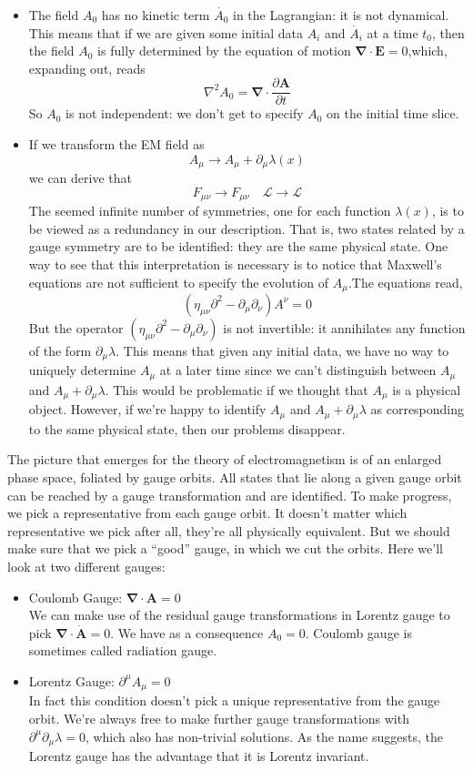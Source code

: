 \begin{itemize}
\item The field $A_0$ has no kinetic term $\dot{A_0}$ in the Lagrangian: it is not dynamical. This means that if we are given some initial data $A_i$ and $\dot{A_i}$ at a time $t_0$, then the field $A_0$ is fully determined by the equation of motion $\bm{\nabla} \cdot \bm{E} = 0$,which, expanding out,
reads
\[\nabla^2 A_0 = \bm{\nabla} \cdot \frac{\partial \bm{A}}{\partial t}\]
So $A_0$ is not independent: we don't get to specify $A_0$ on the initial time slice.
\item If we transform the EM field as
\[A_{\mu} \to A_{\mu} + \partial_{\mu}\lambda(x) \]
we can derive that
\[F_{\mu\nu} \to F_{\mu \nu} \quad \mathcal{L} \to \mathcal{L}\]
The seemed infinite number of symmetries, one for each function $\lambda(x)$, is to be viewed as a redundancy in our description. That is, two states related by a gauge symmetry are to be identified: they are the same physical state. One way to see that this interpretation is necessary is to notice that Maxwell's equations are not sufficient to specify the evolution of $A_{\mu}$.The equations read,
\[(\eta_{\mu\nu} \partial^2 - \partial_{\mu} \partial_{\nu}) A^{\nu} = 0\]
But the operator $(\eta_{\mu\nu} \partial^2 - \partial_{\mu} \partial_{\nu})$ is not invertible: it annihilates any function of
the form $\partial_{\mu} \lambda$. This means that given any initial data, we have no way to uniquely determine $A_{\mu}$ at a later time since we can't distinguish between $A_{\mu}$ and $A_{\mu} + \partial_{\mu} \lambda$. This would be problematic if we thought that $A_{\mu}$ is a physical object. However, if we're happy to identify $A_{\mu}$ and $A_{\mu} + \partial_{\mu} \lambda$ as corresponding to the same physical state, then our problems disappear. 
\end{itemize}

\noindent
The picture that emerges for the theory of electromagnetism is of an enlarged phase space, foliated by gauge orbits. All states that lie along a given gauge orbit can be reached by a gauge transformation and are identified. To make progress, we pick a representative from each gauge orbit. It doesn't matter which representative we pick after all, they're all physically equivalent. But we should make sure that we pick a ``good'' gauge, in which we cut the orbits. Here we'll look at two different gauges:
\begin{itemize}
\item Coulomb Gauge: $\bm{\nabla} \cdot \bm{A} = 0$\\
We can make use of the residual gauge transformations in Lorentz gauge to pick $\bm{\nabla} \cdot \dot{\bm{A}} = 0$. We
have as a consequence $A_0 = 0$. Coulomb gauge is sometimes called radiation gauge.
\item Lorentz Gauge: $\partial^{\mu} A_{\mu} = 0$\\
In fact this condition doesn't pick a unique representative from the gauge orbit. We're always free to make further gauge transformations with $\partial^{\mu}\partial_{\mu} \lambda = 0$, which also has non-trivial solutions. As the name suggests, the Lorentz gauge has the advantage that it is Lorentz invariant.
\end{itemize}


